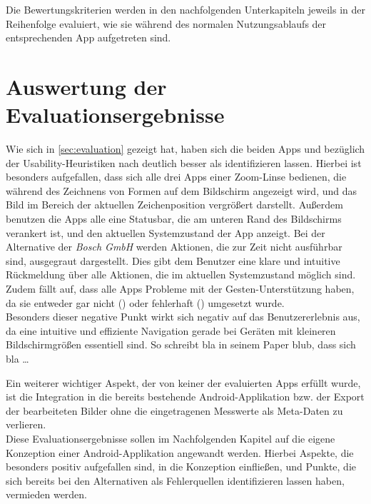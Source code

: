 Die Bewertungskriterien werden in den nachfolgenden Unterkapiteln jeweils in der Reihenfolge evaluiert, wie sie während des normalen Nutzungsablaufs der entsprechenden App aufgetreten sind.




\section{Auswertung der Evaluationsergebnisse}


Wie sich in \autoref{sec:evaluation} gezeigt hat, haben sich die beiden Apps \mm{} und \pm{} bezüglich der Usability-Heuristiken nach \citeauthor{Nielsen94} deutlich besser als \ms{} identifizieren lassen. 
Hierbei ist besonders aufgefallen, dass sich alle drei Apps einer Zoom-Linse bedienen, die während des Zeichnens von Formen auf dem Bildschirm angezeigt wird, und das Bild im Bereich der aktuellen Zeichenposition vergrößert darstellt.
Außerdem benutzen die Apps alle eine Statusbar, die am unteren Rand des Bildschirms verankert ist, und den aktuellen Systemzustand der App anzeigt.
Bei der Alternative der \emph{Bosch GmbH} werden Aktionen, die zur Zeit nicht ausführbar sind, ausgegraut dargestellt. Dies gibt dem Benutzer eine klare und intuitive Rückmeldung über alle Aktionen, die im aktuellen Systemzustand möglich sind.
Zudem fällt auf, dass alle Apps Probleme mit der Gesten-Unterstützung haben, da sie entweder gar nicht () oder fehlerhaft () umgesetzt wurde. \\
Besonders dieser negative Punkt wirkt sich negativ auf das Benutzererlebnis aus, da eine intuitive und effiziente Navigation gerade bei Geräten mit kleineren Bildschirmgrößen essentiell sind. 
So schreibt bla in seinem Paper blub, dass sich bla \dots

Ein weiterer wichtiger Aspekt, der von keiner der evaluierten Apps erfüllt wurde, ist die Integration in die bereits bestehende Android-Applikation bzw. der Export der bearbeiteten Bilder ohne die eingetragenen Messwerte als Meta-Daten zu verlieren. \\

Diese Evaluationsergebnisse sollen im Nachfolgenden Kapitel auf die eigene Konzeption einer Android-Applikation angewandt werden.
Hierbei Aspekte, die besonders positiv aufgefallen sind, in die Konzeption einfließen, und Punkte, die sich bereits bei den Alternativen als Fehlerquellen identifizieren lassen haben, vermieden werden.
